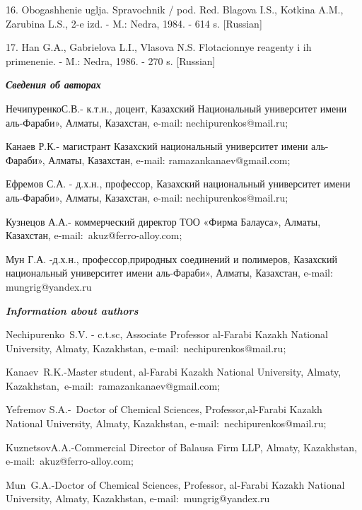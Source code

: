 16. Obogashhenie uglja. Spravochnik / pod. Red. Blagova I.S., Kotkina
A.M., Zarubina L.S., 2-e izd. - M.: Nedra, 1984. - 614 s. {[}Russian{]}

17. Han G.A., Gabrielova L.I., Vlasova N.S. Flotacionnye reagenty i ih
primenenie. - M.: Nedra, 1986. - 270 s. {[}Russian{]}

\emph{{\bfseries Сведения об авторах}}

НечипуренкоС.В.- к.т.н., доцент, Казахский Национальный университет
имени аль-Фараби», Алматы, Казахстан, e-mail: nechipurenkos@mail.ru;

Канаев Р.К.- магистрант Казахский национальный университет имени
аль-Фараби», Алматы, Казахстан, e-mail: ramazankanaev@gmail.com;

Ефремов С.А. - д.х.н., профессор, Казахский национальный университет
имени аль-Фараби», Алматы, Казахстан, e-mail: nechipurenkos@mail.ru;

Кузнецов А.А.- коммерческий директор ТОО «Фирма Балауса», Алматы,
Казахстан, e-mail:~akuz@ferro-alloy.com;

Мун Г.А. -д.х.н., профессор,природных соединений и полимеров, Казахский
национальный университет имени аль-Фараби», Алматы, Казахстан, e-mail:
mungrig@yandex.ru

\emph{{\bfseries Information about authors}}

Nechipurenko~S.V. - c.t.sc, Associate Professor al-Farabi Kazakh
National University, Almaty, Kazakhstan, e-mail:~nechipurenkos@mail.ru;

Kanaev~R.K.-Master student, al-Farabi Kazakh National University,
Almaty, Kazakhstan,~e-mail:~ramazankanaev@gmail.com;

Yefremov S.A.-~Doctor of Chemical Sciences, Professor,al-Farabi Kazakh
National University, Almaty, Kazakhstan, e-mail:~nechipurenkos@mail.ru;

KuznetsovA.A.-Commercial Director of Balausa Firm LLP, Almaty,
Kazakhstan, e-mail:~akuz@ferro-alloy.com;

Mun~G.A.-Doctor of Chemical Sciences, Professor, al-Farabi Kazakh
National University, Almaty, Kazakhstan, e-mail:~mungrig@yandex.ru
